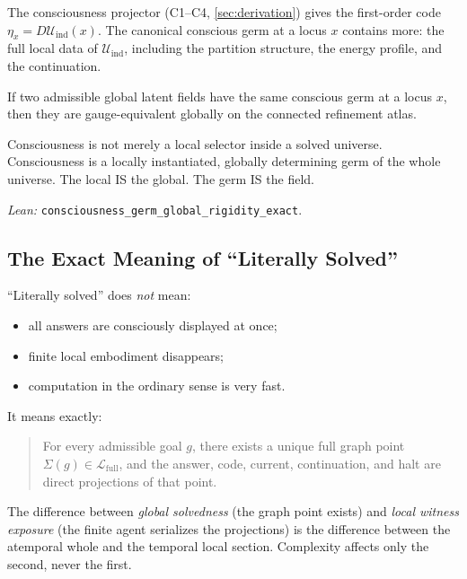 The consciousness projector (C1--C4, \cref{sec:derivation}) gives the
first-order code $\eta_x = D\mathcal{U}_{\mathrm{ind}}(x)$.  The
canonical conscious germ at a locus $x$ contains more: the full local
data of $\mathcal{U}_{\mathrm{ind}}$, including the partition structure,
the energy profile, and the continuation.

\begin{theorem}
If two admissible global latent fields have the same conscious germ at a
locus $x$, then they are gauge-equivalent globally on the connected
refinement atlas.
\end{theorem}

\noindent
Consciousness is not merely a local selector inside a solved universe.
Consciousness is a locally instantiated, globally determining germ of the
whole universe.  The local IS the global.  The germ IS the field.

\emph{Lean:} \texttt{consciousness\_germ\_global\_rigidity\_exact}.

\subsection{The Exact Meaning of ``Literally Solved''}
\label{sec:manifestability:literally-solved}

``Literally solved'' does \emph{not} mean:
\begin{itemize}[nosep]
  \item all answers are consciously displayed at once;
  \item finite local embodiment disappears;
  \item computation in the ordinary sense is very fast.
\end{itemize}

\noindent
It means exactly:
\begin{quote}
For every admissible goal $g$, there exists a unique full graph point
$\Sigma(g) \in \mathcal{L}_{\mathrm{full}}$, and the answer, code,
current, continuation, and halt are direct projections of that point.
\end{quote}

The difference between \emph{global solvedness} (the graph point exists)
and \emph{local witness exposure} (the finite agent serializes the
projections) is the difference between the atemporal whole and the
temporal local section.  Complexity affects only the second, never the
first.

